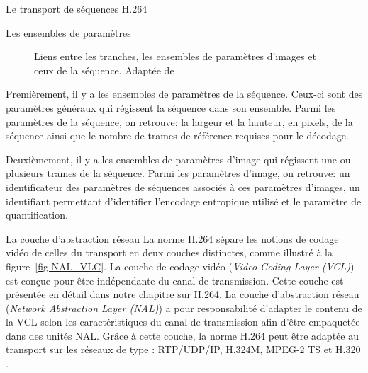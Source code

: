 \documentclass[letterpaper, twoside, 12pt,memoire]{thETS}
\newcommand{\ang}[1]{(\textit{#1})}
\newcommand{\fig}[1]{figure~\ref{#1}}
\begin{document}
\begin{chapter}{Le transport de séquences H.264}
\begin{section}{Les ensembles de paramètres}
\begin{figure}[htb]
\centering
{}
\caption{Liens entre les tranches, les ensembles de paramètres d'images et ceux
de la séquence. Adaptée de \citet[p.~53]{Superiori2006}}
\label{fig-ParameterSet}
\end{figure}

Premièrement, il y a les ensembles de paramètres de la séquence. Ceux-ci sont
des paramètres généraux qui régissent la séquence dans son ensemble. Parmi les
paramètres de la séquence, on retrouve: la largeur et la hauteur, en pixels, de la séquence
ainsi que le nombre de trames de référence requises pour le décodage.

Deuxièmement, il y a les ensembles de paramètres d'image qui régissent une ou
plusieurs trames de la séquence. Parmi les paramètres d'image, on retrouve: un
identificateur des paramètres de séquences associés à ces paramètres d'images,
un identifiant permettant d'identifier l'encodage entropique utilisé et le
paramètre de quantification.


\end{section}

\begin{section}{La couche d'abstraction réseau}
\label{sect-NAL}
La norme H.264 sépare les notions de codage vidéo de celles du transport en deux
couches distinctes, comme illustré à la \fig{fig-NAL_VLC}. La couche de codage
vidéo \ang{Video Coding Layer (VCL)} est conçue pour être indépendante du canal
de transmission. Cette couche est présentée en détail dans notre chapitre sur
H.264. La couche d'abstraction réseau \ang{Network Abstraction Layer (NAL)} a
pour responsabilité d'adapter le contenu de la VCL selon les caractéristiques du
canal de transmission afin d'être empaquetée dans des unités NAL. Grâce à cette
couche, la norme H.264 peut être adaptée au transport sur les réseaux de type :
RTP/UDP/IP, H.324M, MPEG-2 TS et H.320 \citep{Wenger2003}.


\end{section}
\end{chapter}
\end{document}
